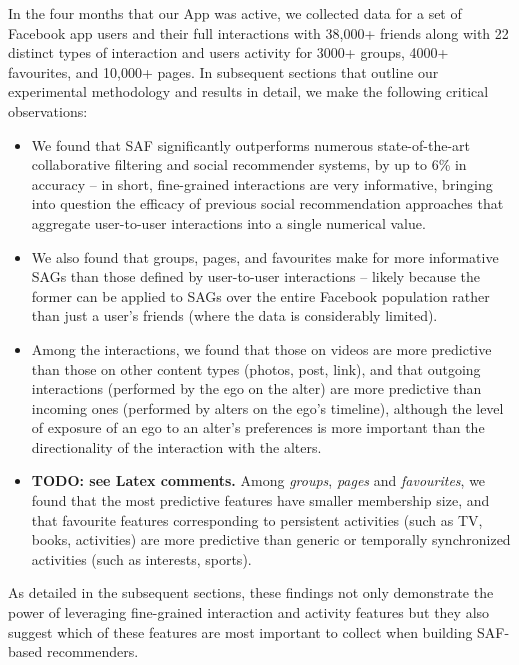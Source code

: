 In the four months that our App was active, we collected data for a set of 
Facebook app users and their full interactions with 38,000+ friends along with 22
distinct types of interaction and users activity for 3000+ groups, 4000+ favourites, and 10,000+ pages. 
In subsequent sections that outline our experimental methodology and results in detail, 
we make the following critical observations:
\begin{itemize}
\item We found that SAF significantly 
outperforms numerous state-of-the-art collaborative filtering and social recommender 
systems, by up to 6\% in accuracy -- in short, fine-grained 
interactions are very informative, bringing into question the efficacy of 
previous social recommendation approaches that aggregate user-to-user interactions into 
a single numerical value.
\item We also found that groups, pages, and favourites make for more informative
SAGs than those defined by user-to-user interactions -- likely because the former can be
applied to SAGs over the entire Facebook population 
rather than just a user's friends (where the data is considerably limited).
\item Among the interactions, we found that those on videos are more predictive than those on other content types (photos, post, link), and that outgoing interactions (performed by the ego on the alter) 
are more predictive than incoming ones (performed by alters on the ego's timeline),
although the level of exposure of an ego to an alter's preferences is more 
important than the directionality of the interaction with the alters.
\item {\bf TODO: see Latex comments.} Among {\em groups}, {\em pages} and {\em favourites}, we found that the most  
predictive features have smaller membership size, and that favourite
features corresponding to persistent activities (such as TV, books,
activities) are more predictive than generic or temporally
synchronized activities (such as interests, sports).
\end{itemize}
As detailed in the subsequent sections, these findings 
not only demonstrate the power of leveraging fine-grained
interaction and activity features but they also suggest which of these
features are most important to collect when building SAF-based recommenders.


